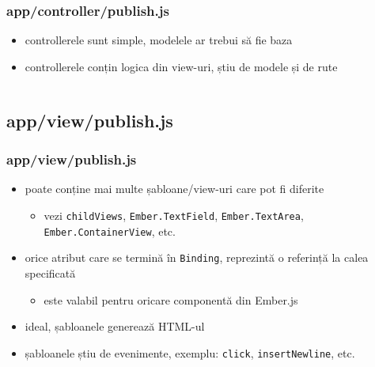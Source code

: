 \documentclass[compress]{beamer}
\begin{document}
\begin{frame}

\frametitle{app/controller/publish.js}

\begin{itemize}[<+->]
  \item controllerele sunt simple, modelele ar trebui să fie baza
  \item controllerele conțin logica din view-uri, știu de modele și de rute
\end{itemize}

\inputminted[fontsize=\tiny,gobble=2,linenos=true,firstline=6,lastline=19]{javascript}{code/js/app/controller/publish.js}

\end{frame}

\subsection{app/view/publish.js}

\begin{frame}

\frametitle{app/view/publish.js}

\begin{itemize}[<+->]
  \item poate conține mai multe șabloane/view-uri care pot fi diferite
  \begin{itemize}[<+->]
    \item vezi \texttt{childViews}, \texttt{Ember.TextField}, \texttt{Ember.TextArea}, \texttt{Ember.ContainerView}, etc.
  \end{itemize}
  \item orice atribut care se termină în \texttt{Binding}, reprezintă o referință la calea specificată
  \begin{itemize}[<+->]
    \item este valabil pentru oricare componentă din Ember.js
  \end{itemize}
  \item ideal, șabloanele generează HTML-ul
  \item șabloanele știu de evenimente, exemplu: \texttt{click}, \texttt{insertNewline}, etc.
\end{itemize}

\inputminted[fontsize=\tiny,gobble=2,linenos=true,firstline=6,lastline=21]{javascript}{code/js/app/view/publish.js}

\end{frame}
\end{document}
